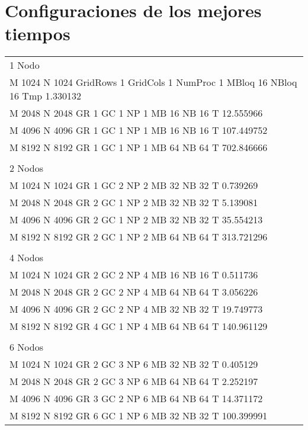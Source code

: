 \appendix
\clearpage
\addappheadtotoc
\appendixpage
\section{Configuraciones de los mejores tiempos}
\label{app:config}

\begin{tabular}{l}
1 Nodo\\
M 1024 N 1024 GridRows 1 GridCols 1 NumProc 1 MBloq 16 NBloq 16 Tmp 1.330132\\
M 2048 N 2048 GR 1 GC 1 NP 1 MB 16 NB 16 T 12.555966\\
M 4096 N 4096 GR 1 GC 1 NP 1 MB 16 NB 16 T 107.449752\\
M 8192 N 8192 GR 1 GC 1 NP 1 MB 64 NB 64 T 702.846666\\\\
2 Nodos\\
M 1024 N 1024 GR 1 GC 2 NP 2 MB 32 NB 32 T 0.739269\\
M 2048 N 2048 GR 2 GC 1 NP 2 MB 32 NB 32 T 5.139081\\
M 4096 N 4096 GR 2 GC 1 NP 2 MB 32 NB 32 T 35.554213\\
M 8192 N 8192 GR 2 GC 1 NP 2 MB 64 NB 64 T 313.721296\\\\
4 Nodos\\
M 1024 N 1024 GR 2 GC 2 NP 4 MB 16 NB 16 T 0.511736\\
M 2048 N 2048 GR 2 GC 2 NP 4 MB 64 NB 64 T 3.056226\\
M 4096 N 4096 GR 2 GC 2 NP 4 MB 32 NB 32 T 19.749773\\
M 8192 N 8192 GR 4 GC 1 NP 4 MB 64 NB 64 T 140.961129\\\\
6 Nodos\\
M 1024 N 1024 GR 2 GC 3 NP 6 MB 32 NB 32 T 0.405129\\
M 2048 N 2048 GR 2 GC 3 NP 6 MB 64 NB 64 T 2.252197\\
M 4096 N 4096 GR 3 GC 2 NP 6 MB 64 NB 64 T 14.371172\\
M 8192 N 8192 GR 6 GC 1 NP 6 MB 32 NB 32 T 100.399991\\
\end{tabular}